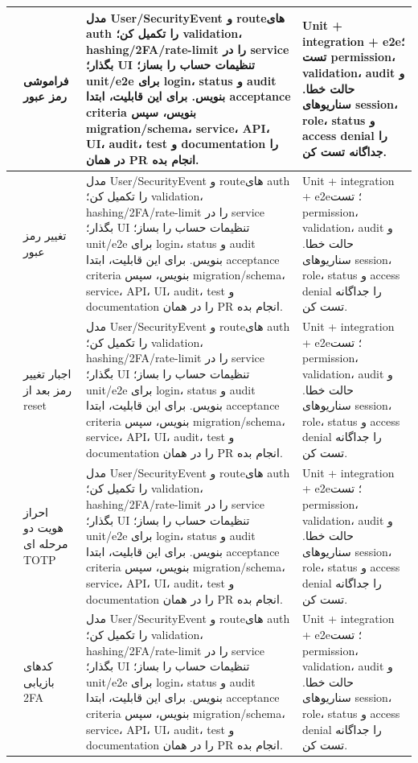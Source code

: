\documentclass[11pt,a4paper]{article}
\begin{document}
\begin{longtable}{|>{\raggedleft\arraybackslash}p{}|>{\raggedleft\arraybackslash}p{}|>{\raggedleft\arraybackslash}p{}|>{\raggedleft\arraybackslash}p{}|}
5 & فراموشی رمز عبور & مدل User/SecurityEvent و routeهای auth را تکمیل کن؛ validation، hashing/2FA/rate-limit را در service بگذار؛ UI تنظیمات حساب را بساز؛ unit/e2e برای login، status و audit بنویس. برای این قابلیت، ابتدا acceptance criteria بنویس، سپس migration/schema، service، API، UI، audit، test و documentation را در همان PR انجام بده. & Unit + integration + e2e؛ تست permission، validation، audit و حالت خطا. سناریوهای session، role، status و access denial را جداگانه تست کن. \\ \hline
6 & تغییر رمز عبور & مدل User/SecurityEvent و routeهای auth را تکمیل کن؛ validation، hashing/2FA/rate-limit را در service بگذار؛ UI تنظیمات حساب را بساز؛ unit/e2e برای login، status و audit بنویس. برای این قابلیت، ابتدا acceptance criteria بنویس، سپس migration/schema، service، API، UI، audit، test و documentation را در همان PR انجام بده. & Unit + integration + e2e؛ تست permission، validation، audit و حالت خطا. سناریوهای session، role، status و access denial را جداگانه تست کن. \\ \hline
7 & اجبار تغییر رمز بعد از reset & مدل User/SecurityEvent و routeهای auth را تکمیل کن؛ validation، hashing/2FA/rate-limit را در service بگذار؛ UI تنظیمات حساب را بساز؛ unit/e2e برای login، status و audit بنویس. برای این قابلیت، ابتدا acceptance criteria بنویس، سپس migration/schema، service، API، UI، audit، test و documentation را در همان PR انجام بده. & Unit + integration + e2e؛ تست permission، validation، audit و حالت خطا. سناریوهای session، role، status و access denial را جداگانه تست کن. \\ \hline
8 & احراز هویت دو مرحله ای TOTP & مدل User/SecurityEvent و routeهای auth را تکمیل کن؛ validation، hashing/2FA/rate-limit را در service بگذار؛ UI تنظیمات حساب را بساز؛ unit/e2e برای login، status و audit بنویس. برای این قابلیت، ابتدا acceptance criteria بنویس، سپس migration/schema، service، API، UI، audit، test و documentation را در همان PR انجام بده. & Unit + integration + e2e؛ تست permission، validation، audit و حالت خطا. سناریوهای session، role، status و access denial را جداگانه تست کن. \\ \hline
9 & کدهای بازیابی 2FA & مدل User/SecurityEvent و routeهای auth را تکمیل کن؛ validation، hashing/2FA/rate-limit را در service بگذار؛ UI تنظیمات حساب را بساز؛ unit/e2e برای login، status و audit بنویس. برای این قابلیت، ابتدا acceptance criteria بنویس، سپس migration/schema، service، API، UI، audit، test و documentation را در همان PR انجام بده. & Unit + integration + e2e؛ تست permission، validation، audit و حالت خطا. سناریوهای session، role، status و access denial را جداگانه تست کن. \\ \hline

\end{longtable}
\end{document}
